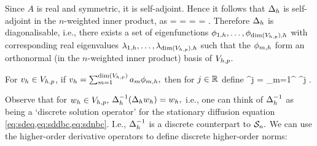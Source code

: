 
Since $A$ is real and symmetric, it is self-adjoint. Hence it follows that $\Delta_{h}$ is self-adjoint in the $n$-weighted inner product, as
\beqs
\IPLtDn{\Deltah \wh}{\vh} =  =  = \overline{\IPLtDn{\Deltah \vh}{\wh}} = \IPLtDn{\wh}{\Deltah \vh}.
\eeqs
Therefore $\Delta_{h}$ is diagonalisable, i.e., there exists a set of eigenfunctions $\phioh,\ldots,\phidimVhph$  with corresponding real eigenvalues $\lambdaoh, \ldots, \lambdadimVhph$ such that the $\phi_{m,h}$ form an orthonormal (in the $n$-weighted inner product) basis of $V_{h,p}$.

\label{def:hodd}
For $v_{h} \in V_{h,p}$, if $\vh = \sum_{m=1}^{\dimVhp} \am \phimh,$ then for $j \in \mathbb R$ define
\beqs
\Deltah^j \vh = \sum_{m=1}^{\dimVhp} \lambdamh^j \am \phimh.
\eeqs


\ede
Observe that for $w_{h} \in V_{h,p},$ $\DeltahI\mleft(\Deltah\wh\mright) = \wh,$ i.e., one can think of $\Delta_{h}^{-1}$ as being a `discrete solution operator' for the stationary diffusion equation \cref{eq:sdeq,eq:sddbc,eq:sdnbc}. I.e., $\Delta_{h}^{-1}$ is a discrete counterpart to $\mathcal S_{n}.$
We can use the higher-order derivative operators to define discrete higher-order norms:

